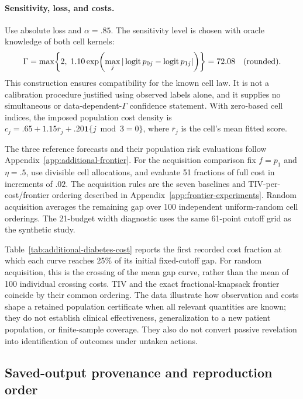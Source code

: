 \paragraph{Sensitivity, loss, and costs.}
Use absolute loss and $\alpha=.85$. The sensitivity level is chosen with oracle
knowledge of both cell kernels:
\[
 \Gamma=\max\!\left\{2,\;1.10\exp\!\left(
 \max_j|\operatorname{logit}p_{0j}-\operatorname{logit}p_{1j}|\right)\right\}
 =72.08{}\quad\text{(rounded)}.
\]
This construction ensures compatibility for the known cell law. It is not a
calibration procedure justified using observed labels alone, and it supplies no
simultaneous or data-dependent-$\Gamma$ confidence statement. With zero-based
cell indices, the imposed population cost density is
$c_j=.65+1.15\bar r_j+.20\mathbf1\{j\bmod3=0\}$, where $\bar r_j$ is the
cell's mean fitted score.

The three reference forecasts and their population risk evaluations follow
Appendix~\ref{app:additional-frontier}. For the acquisition comparison fix
$f=p_1$ and $\eta=.5$, use divisible cell allocations, and evaluate 51 fractions
of full cost in increments of $.02$. The acquisition rules are the seven
baselines and TIV-per-cost/frontier ordering described in
Appendix~\ref{app:frontier-experiments}. Random acquisition averages the remaining
gap over 100 independent uniform-random cell orderings. The 21-budget width
diagnostic uses the same 61-point cutoff grid as the synthetic study.

\SupplementReferenceForecastTable
\SupplementGridBridgeTable
\FloatBarrier

Table~\ref{tab:additional-diabetes-cost} reports the first recorded cost fraction
at which each curve reaches 25\% of its initial fixed-cutoff gap. For random
acquisition, this is the crossing of the mean gap curve, rather than the mean of
100 individual crossing costs. TIV and the exact fractional-knapsack frontier
coincide by their common ordering. The data illustrate how observation and costs
shape a retained population certificate when all relevant quantities are known;
they do not establish clinical effectiveness, generalization to a new patient
population, or finite-sample coverage. They also do not convert passive revelation
into identification of outcomes under untaken actions.

\SupplementDiabetesCostTable
\FloatBarrier

\subsection{Saved-output provenance and reproduction order}
\label{app:additional-provenance}

